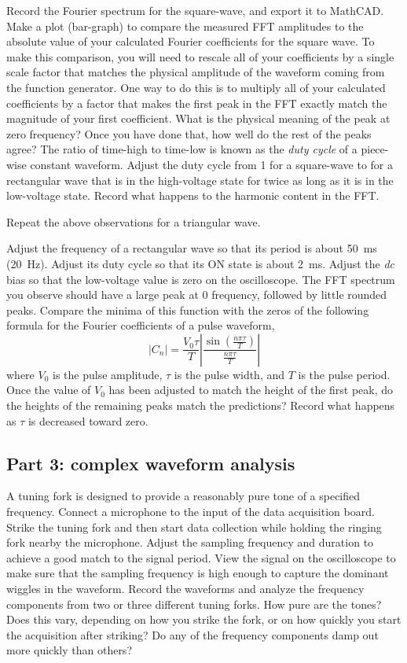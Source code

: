 \documentclass{revtex4}
\begin{document}
Record the Fourier spectrum for the square-wave, and export it to MathCAD.
Make a plot (bar-graph) to compare the measured FFT amplitudes to the
absolute value of your calculated Fourier coefficients for the square wave.
To make this comparison, you will need to rescale all of your coefficients
by a single scale factor that matches the physical amplitude of the waveform
coming from the function generator.  One way to do this is to multiply all
of your calculated coefficients by a factor that makes the first peak in
the FFT exactly match the magnitude of your first coefficient.  What is
the physical meaning of the peak at zero frequency?  Once you
have done that, how well do the rest of the peaks agree?  The ratio of
time-high to time-low is known as the {\em duty cycle} of a piece-wise
constant waveform.  Adjust the duty cycle from 1 for a square-wave to
for a rectangular wave that is in the high-voltage state for twice as long
as it is in the low-voltage state.  Record what happens to the harmonic
content in the FFT.

Repeat the above observations for a triangular wave.

Adjust the frequency of a rectangular wave so that its period is about
50~ms (20~Hz). Adjust its duty cycle so that its ON state is about 2~ms.
Adjust the {\em dc} bias so that the low-voltage value is zero on the
oscilloscope.  The FFT spectrum you observe should have a large peak at
0 frequency, followed by little rounded peaks. Compare the minima of this
function with the zeros of the following formula for the Fourier coefficients
of a pulse waveform,
\begin{equation}
|C_n| = \frac{V_0\tau}{T}\left|\frac{\sin\left(\frac{n\pi\tau}{T}\right)}
{\frac{n\pi\tau}{T}}\right|
\end{equation}
where $V_0$ is the pulse amplitude, $\tau$ is the pulse width, and $T$ is the
pulse period.  Once the value of $V_0$ has been adjusted to match the height
of the first peak, do the heights of the remaining peaks match the predictions?
Record what happens as $\tau$ is decreased toward zero.

\subsection{Part 3: complex waveform analysis}

A tuning fork is designed to provide a reasonably pure tone of a
specified frequency. Connect a microphone to the input of the data
acquisition board.  Strike the tuning fork and then start data collection
while holding the ringing fork nearby the microphone.  Adjust the sampling
frequency and duration to achieve a good match to the signal period.  View
the signal on the oscilloscope to make sure that the sampling frequency is
high enough to capture the dominant wiggles in the waveform.  Record the
waveforms and analyze the frequency components from two or three different
tuning forks. How pure are the tones? Does this vary, depending on how you
strike the fork, or on how quickly you start the acquisition after striking?
Do any of the frequency components damp out more quickly than others?
\end{document}
